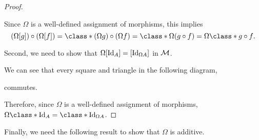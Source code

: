 \begin{proof}
\begin{center}
    \end{center}
    Since \( \Omega \) is a well-defined assignment of morphisms, this implies
    \[
        (\Omega [g]) \circ (\Omega [f]) = \class*{(\Omega g) \circ (\Omega f)} = \class*{\Omega (g \circ f)} = \Omega \class*{g \circ f}.
    \]

    Second, we need to show that \( \Omega [\operatorname{Id}_A] = [\operatorname{Id}_{\Omega A}] \) in \( {\mathcal{M}} \).

    We can see that every square and triangle in the following diagram,
    \begin{center}
    \end{center}
    commutes.

    Therefore, since \( \Omega \) is a well-defined assignment of morphisms, \( \Omega \class*{\Id_A} = \class*{\Id_{\Omega A}} \).
\end{proof}

Finally, we need the following result to show that \( \Omega \) is additive.

